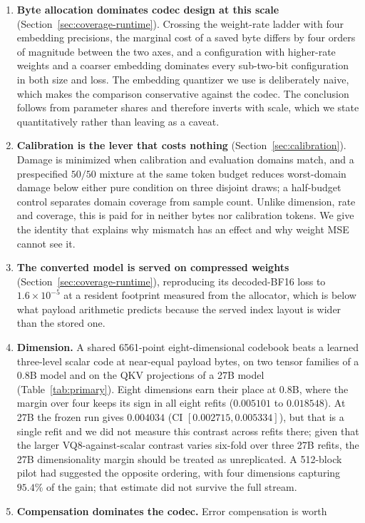 \documentclass[11pt]{article}
\begin{document}
\begin{enumerate}
\item \textbf{Byte allocation dominates codec design at this scale}
(Section~\ref{sec:coverage-runtime}). Crossing the weight-rate ladder with four
embedding precisions, the marginal cost of a saved byte differs by four orders
of magnitude between the two axes, and a configuration with higher-rate weights
and a coarser embedding dominates every sub-two-bit configuration in both size
and loss. The embedding quantizer we use is deliberately naive, which makes the
comparison conservative against the codec. The conclusion follows from parameter
shares and therefore inverts with scale, which we state quantitatively rather
than leaving as a caveat.
\item \textbf{Calibration is the lever that costs nothing}
(Section~\ref{sec:calibration}). Damage is minimized when calibration and
evaluation domains match, and a prespecified $50/50$ mixture at the same token
budget reduces worst-domain damage below either pure condition on three disjoint
draws; a half-budget control separates domain coverage from sample count. Unlike
dimension, rate and coverage, this is paid for in neither bytes nor calibration
tokens. We give the identity that explains why mismatch has an effect and why
weight MSE cannot see it.
\item \textbf{The converted model is served on compressed weights}
(Section~\ref{sec:coverage-runtime}), reproducing its decoded-BF16 loss to
$1.6\times10^{-5}$ at a resident footprint measured from the allocator, which is
below what payload arithmetic predicts because the served index layout is wider
than the stored one.
\item \textbf{Dimension.} A shared 6561-point eight-dimensional codebook beats a
learned three-level scalar code at near-equal payload bytes, on two tensor
families of a 0.8B model and on the QKV projections of a 27B model
(Table~\ref{tab:primary}). Eight dimensions earn their place at 0.8B, where the
margin over four keeps its sign in all eight refits ($0.005101$ to $0.018548$).
At 27B the frozen run gives $0.004034$ (CI $[0.002715, 0.005334]$), but that is
a single refit and we did not measure this contrast across refits there; given
that the larger VQ8-against-scalar contrast varies six-fold over three 27B
refits, the 27B dimensionality margin should be treated as unreplicated. A
512-block pilot had suggested the opposite ordering, with four dimensions
capturing $95.4\%$ of the gain; that estimate did not survive the full stream.
\item \textbf{Compensation dominates the codec.} Error compensation is worth

\end{enumerate}
\end{document}
